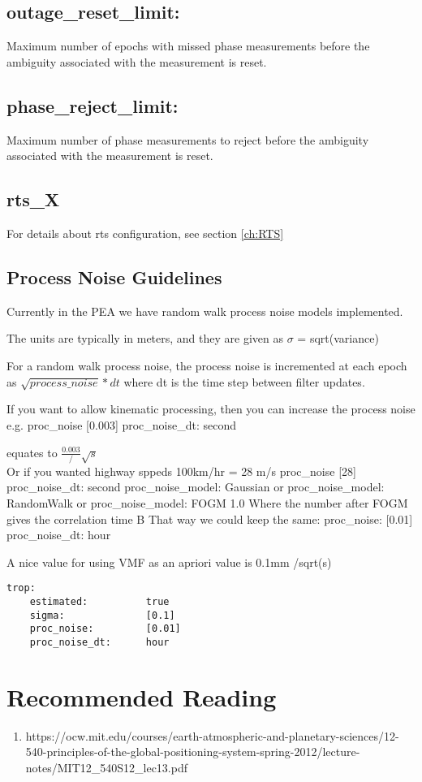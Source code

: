 \subsection{outage\_reset\_limit:}
Maximum number of epochs with missed phase measurements before the ambiguity associated with the measurement is reset.

\subsection{phase\_reject\_limit:}
Maximum number of phase measurements to reject before the ambiguity associated with the measurement is reset.


\subsection*{rts\_X}

For details about rts configuration, see section \ref{ch:RTS}







\subsection{Process Noise Guidelines}

Currently in the PEA we have random walk process noise models implemented.

The units are typically in meters, and they are given as $\sigma$ = sqrt(variance)

For a random walk process noise, the process noise is incremented at each epoch as $\sqrt{process\_noise}*dt$ where dt is the time step between filter updates.

If you want to allow kinematic processing, then you can increase the process noise e.g.
proc\_noise [0.003]
proc\_noise\_dt: second 

equates to $\frac{0.003}/\sqrt{s}$
\\ 
Or if you wanted highway sppeds 100km/hr = 28 m/s
proc\_noise [28]
proc\_noise\_dt: second
proc\_noise\_model:   Gaussian
or
         proc\_noise\_model:   RandomWalk
or
         proc\_noise\_model:   FOGM 1.0
Where the number after FOGM gives the correlation time B
That way we could keep the same:
            proc\_noise:         [0.01]
            proc\_noise\_dt:      hour

A nice value for using VMF as an apriori value is 0.1mm /sqrt(s)
%
\begin{lstlisting}
trop:
    estimated:          true
    sigma:              [0.1]
    proc_noise:         [0.01]
    proc_noise_dt:      hour
\end{lstlisting}



\section{Recommended Reading}

\begin{enumerate}
    \item https://ocw.mit.edu/courses/earth-atmospheric-and-planetary-sciences/12-540-principles-of-the-global-positioning-system-spring-2012/lecture-notes/MIT12\_540S12\_lec13.pdf
\end{enumerate}






